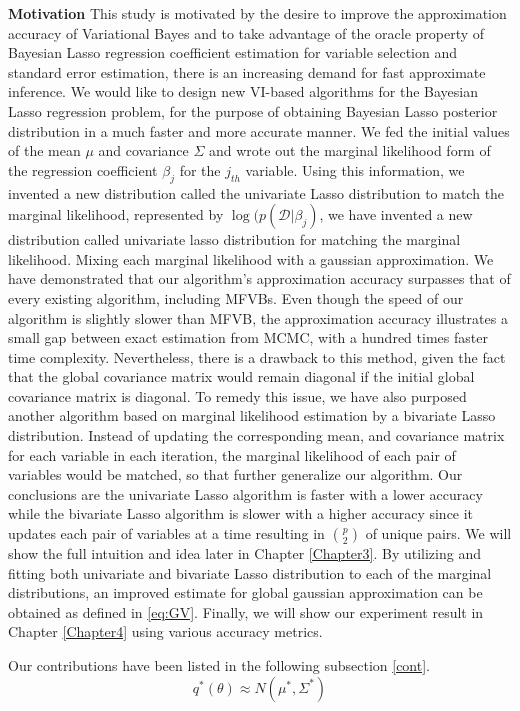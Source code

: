 \textbf{Motivation}
This study is motivated by the desire to improve the approximation accuracy of Variational Bayes and to take advantage of the oracle property of Bayesian Lasso regression coefficient estimation for variable selection and standard error estimation, there is an increasing demand for fast approximate inference. We would like to design new VI-based algorithms for the Bayesian Lasso regression problem, for the purpose of obtaining Bayesian Lasso posterior distribution in a much faster and more accurate manner.
We fed the initial values of the mean $\mu$ and covariance $\Sigma$ and wrote out the marginal likelihood form of the regression coefficient $\beta_j$ for the $j_{th}$ variable. Using this information, we invented a new distribution called the univariate Lasso distribution to match the marginal likelihood, represented by $\log(p(\mathcal{D}|\beta_j)$, we have invented a new distribution called univariate lasso distribution for matching the marginal likelihood. Mixing each marginal likelihood with a gaussian approximation. We have demonstrated that our algorithm's approximation accuracy surpasses that of every existing algorithm, including MFVBs. Even though the speed of our algorithm is slightly slower than MFVB, the approximation accuracy illustrates a small gap between exact estimation from MCMC, with a hundred times faster time complexity. Nevertheless, there is a drawback to this method, given the fact that the global covariance matrix would remain diagonal if the initial global covariance matrix is diagonal.
To remedy this issue, we have also purposed another algorithm based on marginal likelihood estimation by a bivariate Lasso distribution. Instead of updating the corresponding mean, and covariance matrix for each variable in each iteration, the marginal likelihood of each pair of variables would be matched, so that further generalize our algorithm. Our conclusions are the univariate Lasso algorithm is faster with a lower accuracy while the bivariate Lasso algorithm is slower with a higher accuracy since it updates each pair of variables at a time resulting in ${p\choose 2}$ of unique pairs. We will show the full intuition and idea later in Chapter \ref{Chapter3}.
By utilizing and fitting both univariate and bivariate Lasso distribution to each of the marginal distributions, an improved estimate for global gaussian approximation can be obtained as defined in \autoref{eq:GV}. Finally, we will show our experiment result in Chapter \ref{Chapter4} using various accuracy metrics.

Our contributions have been listed in the following subsection \ref{cont}.
\begin{equation}
	\label{eq:GV}
	q^{*}(\theta) \approx N(\mu^*,\Sigma^*)
\end{equation}

